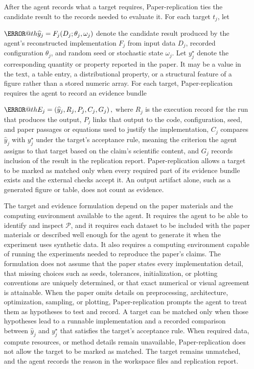 \documentclass[authoryear,5p,times,nopreprintline]{elsarticle}
\makeatletter
\renewenvironment{equation}%
  {\@beginparpenalty\predisplaypenalty
   \@endparpenalty\postdisplaypenalty
   \refstepcounter{equation}%
   \trivlist\item[]\leavevmode
   \hb@xt@\linewidth\bgroup\hfil$\m@th\displaystyle}%
  {$\hfil\llap{\@eqnnum}\egroup
   \endtrivlist}
\makeatother
\begin{document}
After the agent records what a target requires, Paper-replication ties the candidate result to the records needed to evaluate it.
For each target \(t_j\), let
\begin{equation}
\widehat{y}_j = F_j\!\left(D_j;\theta_j,\omega_j\right)
\label{eq:target_generation}
\end{equation}
denote the candidate result produced by the agent's reconstructed implementation \(F_j\) from input data \(D_j\), recorded configuration \(\theta_j\), and random seed or stochastic state \(\omega_j\).
Let \(y_j^{\star}\) denote the corresponding quantity or property reported in the paper.
It may be a value in the text, a table entry, a distributional property, or a structural feature of a figure rather than a stored numeric array.
For each target, Paper-replication requires the agent to record an evidence bundle
\begin{equation}
E_j = \left(\widehat{y}_j, R_j, P_j, C_j, G_j\right),
\label{eq:evidence_bundle}
\end{equation}
where \(R_j\) is the execution record for the run that produces the output, \(P_j\) links that output to the code, configuration, seed, and paper passages or equations used to justify the implementation, \(C_j\) compares \(\widehat{y}_j\) with \(y_j^{\star}\) under the target's acceptance rule, meaning the criterion the agent assigns to that target based on the claim's scientific content, and \(G_j\) records inclusion of the result in the replication report.
Paper-replication allows a target to be marked as matched only when every required part of its evidence bundle exists and the external checks accept it.
An output artifact alone, such as a generated figure or table, does not count as evidence.

The target and evidence formulation depend on the paper materials and the computing environment available to the agent.
It requires the agent to be able to identify and inspect \(\mathcal{P}\), and it requires each dataset to be included with the paper materials or described well enough for the agent to generate it when the experiment uses synthetic data.
It also requires a computing environment capable of running the experiments needed to reproduce the paper's claims.
The formulation does not assume that the paper states every implementation detail, that missing choices such as seeds, tolerances, initialization, or plotting conventions are uniquely determined, or that exact numerical or visual agreement is attainable.
When the paper omits details on preprocessing, architecture, optimization, sampling, or plotting, Paper-replication prompts the agent to treat them as hypotheses to test and record.
A target can be matched only when those hypotheses lead to a runnable implementation and a recorded comparison between \(\widehat{y}_j\) and \(y_j^{\star}\) that satisfies the target's acceptance rule.
When required data, compute resources, or method details remain unavailable, Paper-replication does not allow the target to be marked as matched.
The target remains unmatched, and the agent records the reason in the workspace files and replication report.
\end{document}
